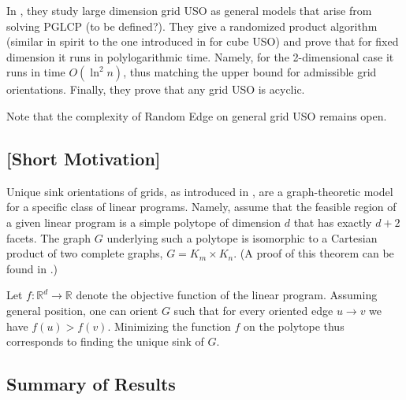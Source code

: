 \documentclass[runningheads,a4paper]{llncs}
\newcommand{\RR}{\ensuremath{\mathbb{R}}}
\begin{document}
In \cite{grid08}, they study large dimension grid USO as general models that arise from solving PGLCP (to be defined?). They give a randomized product algorithm (similar in spirit to the one introduced in \cite{SW} for cube USO) and prove that for fixed dimension it runs in polylogarithmic time. Namely, for the 2-dimensional case it runs in time $O(\ln^2 n)$, thus matching the upper bound for admissible grid orientations. Finally, they prove that any grid USO is acyclic.

Note that the complexity of Random Edge on general grid USO remains open.

\subsection{[Short Motivation]}

Unique sink orientations of grids, as introduced in \cite{linepointstoc},
are a graph-theoretic model for a specific class of linear programs.
Namely, assume that the feasible region of a given linear program is a
simple polytope of dimension $d$ that has exactly $d+2$ facets.
The graph $G$ underlying such a polytope is isomorphic to a Cartesian product
of two complete graphs, $G = K_m \times K_n$.
(A proof of this theorem can be found in \cite{grid05}.)

Let $f : \RR^d \to \RR$ denote the objective function of the linear program.
Assuming general position, one can orient $G$ such that for every oriented
edge $u \to v$ we have $f(u) > f(v)$.
Minimizing the function $f$ on the polytope thus corresponds to finding the
unique sink of $G$.

\subsection{Summary of Results}
\end{document}
